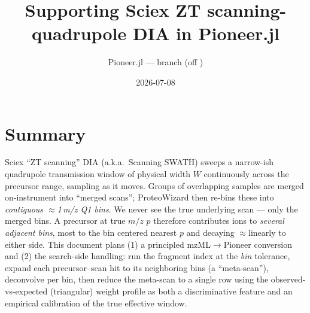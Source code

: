 \documentclass[11pt]{article}
\title{\textbf{Supporting Sciex ZT scanning-quadrupole DIA in Pioneer.jl}}
\author{Pioneer.jl --- branch \code{feat/sciex-zt-scanning} (off \code{perf/pep099-bitvec-random})}
\date{2026-07-08}
\begin{document}
\maketitle

\section{Summary}
Sciex ``ZT scanning'' DIA (a.k.a.\ Scanning SWATH) sweeps a narrow-ish quadrupole transmission
window of physical width $W$ continuously across the precursor range, sampling as it moves. Groups of
overlapping samples are merged on-instrument into ``merged scans''; ProteoWizard then re-bins these into
\emph{contiguous $\approx$1\,m/z Q1 bins}. We never see the true underlying scan --- only the merged
bins. A precursor at true $m/z$ $p$ therefore contributes ions to \emph{several adjacent bins}, most to
the bin centered nearest $p$ and decaying $\approx$linearly to either side. This document plans (1) a
principled mzML$\to$Pioneer conversion and (2) the search-side handling: run the fragment index at the
\emph{bin} tolerance, expand each precursor--scan hit to its neighboring bins (a ``meta-scan''),
deconvolve per bin, then reduce the meta-scan to a single row using the observed-vs-expected
(triangular) weight profile as both a discriminative feature and an empirical calibration of the true
effective window.
\end{document}
